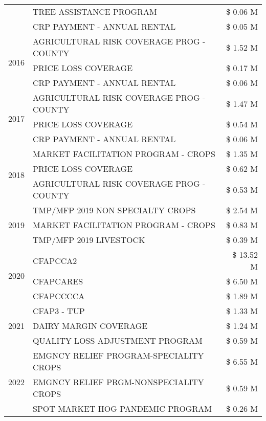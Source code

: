 \begin{tabular}{llr}
 & TREE ASSISTANCE PROGRAM & \$ 0.06 M \\
 & CRP PAYMENT - ANNUAL RENTAL & \$ 0.05 M \\
\cline{1-3}
\multirow[t]{3}{*}{2016} & AGRICULTURAL RISK COVERAGE PROG - COUNTY & \$ 1.52 M \\
 & PRICE LOSS COVERAGE & \$ 0.17 M \\
 & CRP PAYMENT - ANNUAL RENTAL & \$ 0.06 M \\
\cline{1-3}
\multirow[t]{3}{*}{2017} & AGRICULTURAL RISK COVERAGE PROG - COUNTY & \$ 1.47 M \\
 & PRICE LOSS COVERAGE & \$ 0.54 M \\
 & CRP PAYMENT - ANNUAL RENTAL & \$ 0.06 M \\
\cline{1-3}
\multirow[t]{3}{*}{2018} & MARKET FACILITATION PROGRAM - CROPS & \$ 1.35 M \\
 & PRICE LOSS COVERAGE & \$ 0.62 M \\
 & AGRICULTURAL RISK COVERAGE PROG - COUNTY & \$ 0.53 M \\
\cline{1-3}
\multirow[t]{3}{*}{2019} & TMP/MFP 2019 NON SPECIALTY CROPS & \$ 2.54 M \\
 & MARKET FACILITATION PROGRAM - CROPS & \$ 0.83 M \\
 & TMP/MFP 2019 LIVESTOCK & \$ 0.39 M \\
\cline{1-3}
\multirow[t]{3}{*}{2020} & CFAPCCA2 & \$ 13.52 M \\
 & CFAPCARES & \$ 6.50 M \\
 & CFAPCCCCA & \$ 1.89 M \\
\cline{1-3}
\multirow[t]{3}{*}{2021} & CFAP3 - TUP & \$ 1.33 M \\
 & DAIRY MARGIN COVERAGE & \$ 1.24 M \\
 & QUALITY LOSS ADJUSTMENT PROGRAM & \$ 0.59 M \\
\cline{1-3}
\multirow[t]{3}{*}{2022} & EMGNCY RELIEF PROGRAM-SPECIALITY CROPS & \$ 6.55 M \\
 & EMGNCY RELIEF PRGM-NONSPECIALITY CROPS & \$ 0.59 M \\
 & SPOT MARKET HOG PANDEMIC PROGRAM & \$ 0.26 M \\
\cline{1-3}
\bottomrule
\end{tabular}
